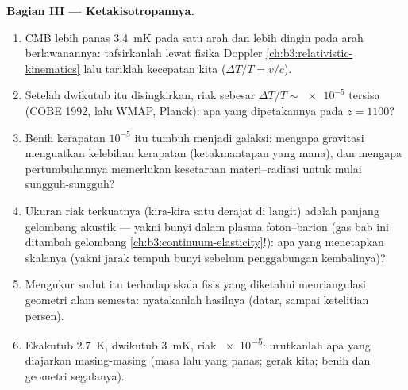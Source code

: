 \begin{problem}
\medskip\noindent\textbf{Bagian III --- Ketakisotropannya.}
\begin{enumerate}[resume]
  \item CMB lebih panas \qty{3.4}{mK} pada satu arah dan lebih dingin
        pada arah berlawanannya: tafsirkanlah lewat fisika Doppler
        \cref{ch:b3:relativistic-kinematics} lalu tariklah
        kecepatan kita ($\Delta T/T = v/c$).
  \item Setelah dwikutub itu disingkirkan, riak sebesar $\Delta T/T \sim
        \num{e-5}$ tersisa (COBE 1992, lalu WMAP, Planck): apa yang
        dipetakannya pada $z = 1100$?
  \item Benih kerapatan $10^{-5}$ itu tumbuh menjadi galaksi: mengapa
        gravitasi menguatkan kelebihan kerapatan (ketakmantapan yang
        mana), dan mengapa pertumbuhannya memerlukan kesetaraan
        materi--radiasi untuk mulai sungguh-sungguh?
  \item Ukuran riak terkuatnya (kira-kira satu derajat di langit)
        adalah panjang gelombang akustik --- yakni bunyi dalam plasma
        foton--barion (gas bab ini ditambah gelombang
        \cref{ch:b3:continuum-elasticity}!): apa yang menetapkan
        skalanya (yakni jarak tempuh bunyi sebelum penggabungan
        kembalinya)?
  \item Mengukur sudut itu terhadap skala fisis yang diketahui
        menriangulasi geometri alam semesta: nyatakanlah hasilnya
        (datar, sampai ketelitian persen).
  \item Ekakutub \qty{2.7}{K}, dwikutub \qty{3}{mK}, riak
        \num{e-5}: urutkanlah apa yang diajarkan masing-masing (masa lalu
        yang panas; gerak kita; benih dan geometri segalanya).
\end{enumerate}


\end{problem}

